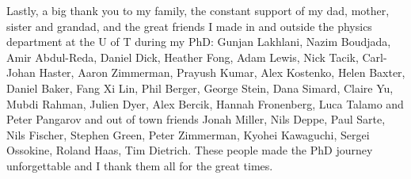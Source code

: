 \begin{preliminary}
\begin{acknowledgements}
Lastly, a big thank you to my family, the constant support of my dad, mother, sister and grandad, and the great friends I made in and outside the physics department at the U of T during my PhD: Gunjan Lakhlani, Nazim Boudjada, Amir Abdul-Reda, Daniel Dick, Heather Fong, Adam Lewis, Nick Tacik, Carl-Johan Haster, Aaron Zimmerman, Prayush Kumar, Alex Kostenko, Helen Baxter, Daniel Baker, Fang Xi Lin, Phil Berger, George Stein, Dana Simard, Claire Yu, Mubdi Rahman, Julien Dyer, Alex Bercik, Hannah Fronenberg, Luca Talamo and Peter Pangarov and out of town friends Jonah Miller, Nils Deppe, Paul Sarte, Nils Fischer, Stephen Green, Peter Zimmerman, Kyohei Kawaguchi, Sergei Ossokine, Roland Haas, Tim Dietrich. These people made the PhD journey unforgettable and I thank them all for the great times.


\end{acknowledgements}

\tableofcontents

\listoftables

\listoffigures

\end{preliminary}

%







